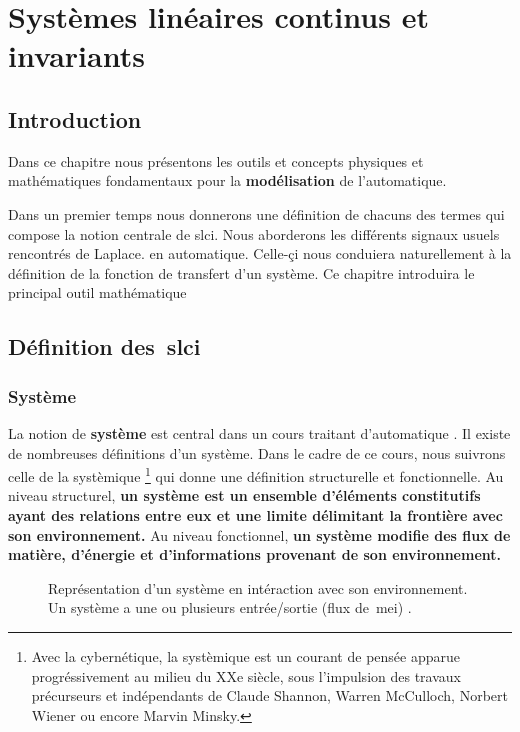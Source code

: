 \chapter[Systèmes linéaires, continus\ldots]{Systèmes linéaires continus et invariants\label{chap-SLCI}}
\adjustmtc
\minitoc
\newpage
\section{Introduction}
Dans ce chapitre nous présentons les outils et concepts 
physiques et mathématiques fondamentaux pour la \textbf{modélisation}
de l'automatique.

Dans un premier temps nous donnerons une définition de chacuns 
des termes qui compose la notion centrale de \gls{slci}.
Nous aborderons les différents signaux usuels rencontrés de Laplace. 
en automatique.
Celle-çi nous conduiera naturellement à la définition de la fonction 
de transfert d'un système.
Ce chapitre introduira le principal outil mathématique 

\section{Définition des~\gls{slci}}
\subsection{Système}
La notion de \textbf{système} est central dans un cours traitant
d'automatique . Il existe de nombreuses définitions d'un système.
Dans le cadre de ce cours, nous suivrons celle de la systèmique
\footnote{Avec la cybernétique, la systèmique est un courant de pensée
apparue progréssivement au milieu du XXe siècle, sous l'impulsion
des travaux précurseurs et indépendants de Claude Shannon, Warren McCulloch, 
Norbert Wiener ou encore Marvin Minsky.} qui donne une définition structurelle 
et fonctionnelle.
Au niveau structurel, \textbf{un système est un ensemble 
d'éléments constitutifs ayant des relations entre eux et 
une limite délimitant la frontière avec son environnement.}
Au niveau fonctionnel, \textbf{un système modifie des flux de 
matière, d'énergie et 
d'informations provenant de son environnement.}


\begin{figure}[!h]
\begin{center}
    
\end{center}
\caption{Représentation d'un système en intéraction avec son environnement. Un système a une ou plusieurs entrée/sortie (flux de~\gls{mei}) . }
\end{figure}

